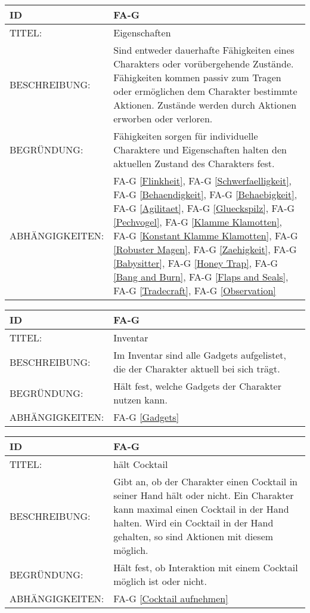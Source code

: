 \begin{tabularx}{16cm}{l|X}
	{table}\label{Eigenschaften}
	\textbf{ID} & \textbf{FA-G \arabic{table}} \\
	\hline
	TITEL: & Eigenschaften \\
	\hline
	BESCHREIBUNG: & Sind entweder dauerhafte Fähigkeiten eines Charakters oder vorübergehende Zustände. Fähigkeiten kommen passiv zum Tragen oder ermöglichen dem Charakter bestimmte Aktionen. Zustände werden durch Aktionen erworben oder verloren.\\
	\hline
	BEGRÜNDUNG: & Fähigkeiten sorgen für individuelle Charaktere und Eigenschaften halten den aktuellen Zustand des Charakters fest. \\
	\hline
	ABHÄNGIGKEITEN: & FA-G \ref{Flinkheit}, FA-G \ref{Schwerfaelligkeit}, FA-G \ref{Behaendigkeit}, FA-G \ref{Behaebigkeit}, FA-G \ref{Agilitaet}, FA-G \ref{Glueckspilz}, FA-G \ref{Pechvogel}, FA-G \ref{Klamme Klamotten}, FA-G \ref{Konstant Klamme Klamotten}, FA-G \ref{Robuster Magen}, FA-G \ref{Zaehigkeit}, FA-G \ref{Babysitter}, FA-G \ref{Honey Trap}, FA-G \ref{Bang and Burn}, FA-G \ref{Flaps and Seals}, FA-G \ref{Tradecraft}, FA-G \ref{Observation} \\
\end{tabularx}

\begin{tabularx}{16cm}{l|X}
	{table}\label{Inventar}
	\textbf{ID} & \textbf{FA-G \arabic{table}} \\
	\hline
	TITEL: & Inventar \\
	\hline
	BESCHREIBUNG: & Im Inventar sind alle Gadgets aufgelistet, die der Charakter aktuell bei sich trägt.\\
	\hline
	BEGRÜNDUNG: & Hält fest, welche Gadgets der Charakter nutzen kann.\\
	\hline
	ABHÄNGIGKEITEN: & FA-G \ref{Gadgets}\\
\end{tabularx}

\begin{tabularx}{16cm}{l|X}
	{table}\label{haelt Cocktail}
	\textbf{ID} & \textbf{FA-G \arabic{table}} \\
	\hline
	TITEL: & hält Cocktail \\
	\hline
	BESCHREIBUNG: & Gibt an, ob der Charakter einen Cocktail in seiner Hand hält oder nicht. Ein Charakter kann maximal einen Cocktail in der Hand halten. Wird ein Cocktail in der Hand gehalten, so sind Aktionen mit diesem möglich. \\
	\hline
	BEGRÜNDUNG: & Hält fest, ob Interaktion mit einem Cocktail möglich ist oder nicht.\\
	\hline
	ABHÄNGIGKEITEN: & FA-G \ref{Cocktail aufnehmen}\\
\end{tabularx}

